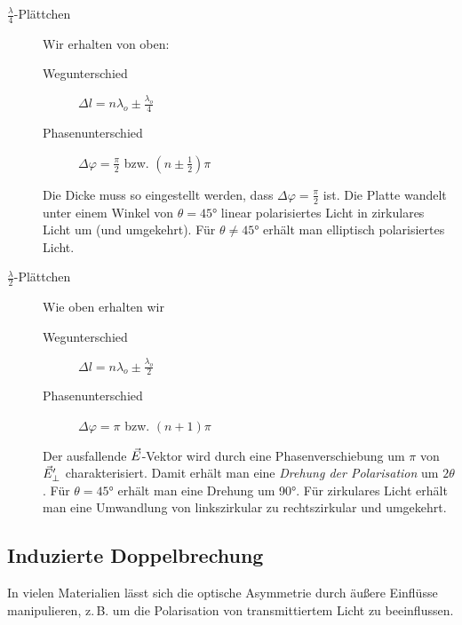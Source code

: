 \begin{description}
\item[$\frac{\lambda}{4}$-Plättchen] Wir erhalten von oben:
  \begin{description}
  \item[Wegunterschied] $\Delta l = n\lambda_o \pm \frac{\lambda_o}{4}$
  \item[Phasenunterschied] $\Delta\varphi = \frac{\pi}{2}$
    bzw. $(n\pm \frac{1}{2})\pi$
  \end{description}
  Die Dicke muss so eingestellt werden, dass
  $\Delta\varphi=\frac{\pi}{2}$ ist. Die Platte wandelt unter einem
  Winkel von $\theta=\ang{45}$ linear polarisiertes Licht in
  zirkulares Licht um (und umgekehrt).
  Für $\theta\neq\ang{45}$ erhält man elliptisch polarisiertes Licht.
\item[$\frac{\lambda}{2}$-Plättchen] Wie oben erhalten wir
  \begin{description}
    \item[Wegunterschied] $\Delta l = n\lambda_o \pm \frac{\lambda_o}{2}$
    \item[Phasenunterschied] $\Delta\varphi = \pi$
      bzw. $(n+1)\pi$
  \end{description}
  Der ausfallende $\vec{E}$-Vektor wird durch eine Phasenverschiebung
  um $\pi$ von $\vec{E}_\bot^\prime$ charakterisiert.
  Damit erhält man eine \emph{Drehung der Polarisation} um $2\theta$.
  Für $\theta=\ang{45}$ erhält man eine Drehung um \ang{90}.
  Für zirkulares Licht erhält man eine Umwandlung von linkszirkular zu
  rechtszirkular und umgekehrt.
\end{description}


\subsection{Induzierte Doppelbrechung}
In vielen Materialien lässt sich die optische Asymmetrie durch äußere
Einflüsse manipulieren, z.\,B. um die Polarisation von transmittiertem
Licht zu beeinflussen.

